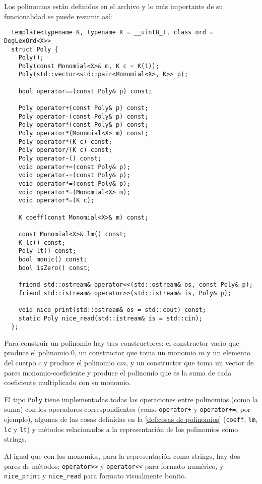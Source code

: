 \documentclass[12pt]{report}
\theoremstyle{customstyle}
\theoremstyle{factstyle}
\begin{document}
Los polinomios están definidos en el archivo  y lo más importante de su funcionalidad se puede resumir así:

\begin{verbatim}
  template<typename K, typename X = __uint8_t, class ord = DegLexOrd<X>>
  struct Poly {
    Poly();
    Poly(const Monomial<X>& m, K c = K(1));
    Poly(std::vector<std::pair<Monomial<X>, K>> p);

    bool operator==(const Poly& p) const;

    Poly operator+(const Poly& p) const;
    Poly operator-(const Poly& p) const;
    Poly operator*(const Poly& p) const;
    Poly operator*(Monomial<X> m) const;
    Poly operator*(K c) const;
    Poly operator/(K c) const;
    Poly operator-() const;
    void operator+=(const Poly& p);
    void operator-=(const Poly& p);
    void operator*=(const Poly& p);
    void operator*=(Monomial<X> m);
    void operator*=(K c);

    K coeff(const Monomial<X>& m) const;

    const Monomial<X>& lm() const;
    K lc() const;
    Poly lt() const;
    bool monic() const;
    bool isZero() const;

    friend std::ostream& operator<<(std::ostream& os, const Poly& p);
    friend std::istream& operator>>(std::istream& is, Poly& p);

    void nice_print(std::ostream& os = std::cout) const;
    static Poly nice_read(std::istream& is = std::cin);
  };
\end{verbatim}

Para construir un polinomio hay tres constructores: el constructor vacío que produce el polinomio $0$, un constructor que toma un monomio $m$ y un elemento del cuerpo $c$ y produce el polinomio $cm$, y un constructor que toma un vector de pares monomio-coeficiente y produce el polinomio que es la suma de cada coeficiente multiplicado con su monomio.

El tipo \texttt{Poly} tiene implementadas todas las operaciones entre polinomios (como la suma) con los operadores correspondientes (como \texttt{operator+} y \texttt{operator+=}, por ejemplo), algunas de las cosas definidas en la \cref{def:cosas de polinomios} (\texttt{coeff}, \texttt{lm}, \texttt{lc} y \texttt{lt}) y métodos relacionados a la representación de los polinomios como strings. %

Al igual que con los monomios, para la representación como strings, hay dos pares de métodos: \texttt{operator>>} y \texttt{operator<<} para formato numérico, y \texttt{nice\_print} y \texttt{nice\_read} para formato visualmente bonito.
\end{document}
